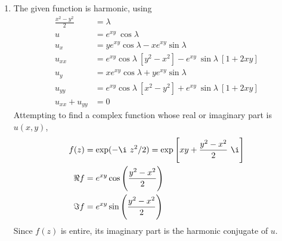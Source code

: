 \begin{enumerate}
\begin{enumerate}
              \item The given function is \textcolor{y_h}{harmonic}, using
                    \begin{align}
                        \frac{x^2 - y^2}{2} & = \lambda                          \\
                        u                   & = e^{xy}\ \cos \lambda             \\
                        u_x                 & = ye^{xy} \cos \lambda
                        - xe^{xy} \sin\lambda                                    \\
                        u_{xx}              & = e^{xy} \cos \lambda
                        \ [y^2 - x^2] -  e^{xy}\ \sin\lambda
                        \ [1 + 2xy]                                              \\
                        u_y                 & = xe^{xy} \cos \lambda
                        + ye^{xy} \sin\lambda                                    \\
                        u_{yy}              & = e^{xy} \cos \lambda\ [x^2 - y^2]
                        +  e^{xy}\ \sin\lambda\ [1 + 2xy]                        \\
                        u_{xx} + u_{yy}     & = 0
                    \end{align}
                    Attempting to find a complex function whose real or imaginary part
                    is $ u(x, y) $,
                    \begin{align}
                        f(z)   & = \exp(-\i\ z^2/2) = \exp\Bigg[xy
                        + \frac{y^2 - x^2}{2}\ \i\Bigg]                         \\
                        \Re{f} & = e^{xy} \cos\Bigg( \frac{y^2 - x^2}{2} \Bigg) \\
                        \Im{f} & = e^{xy} \sin\Bigg( \frac{y^2 - x^2}{2} \Bigg)
                    \end{align}
                    Since $ f(z) $ is entire, its imaginary part is the harmonic
                    conjugate of $ u $.


\end{enumerate}
\end{enumerate}

